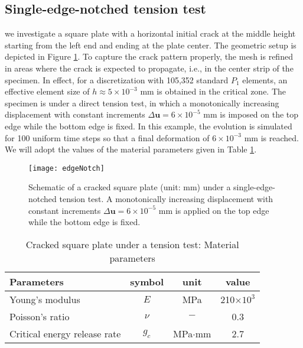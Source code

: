 
\subsection{Single-edge-notched tension test}
 we  investigate a square plate with a horizontal {initial} crack at the middle height starting from the left end and ending at the plate center. The geometric setup is depicted in Figure \ref{Fig:Notched_geometry}. To capture the crack pattern properly, the mesh is refined in areas where the crack is expected to propagate, i.e., in the center strip of the specimen. In effect, for a discretization with 105,352 standard $P_1$ elements, an effective element size of $h\approx 5\times 10^{-3}$ mm is obtained in the critical zone. The specimen is under a direct tension test, in which a monotonically increasing displacement with constant increments $\Delta\bm{u}=6 \times 10^{-5}$ mm is imposed on the top edge while the bottom edge is fixed. In this example, the evolution is simulated for 100 uniform time steps so that a final deformation of $6\times 10^{-3}$ mm is reached. We will adopt the values of the material parameters given in Table \ref{Tab:Notched_input}. 
\begin{figure}[htbp]
    \centering
    \texttt{[image: edgeNotch]}
    \caption{Schematic of a cracked square plate (unit: mm) under a single-edge-notched tension test. 
    A monotonically increasing displacement with constant increments $\Delta\bm{u}=6\times 10^{-5}$ mm is applied on the top edge while the bottom edge is fixed.}
    \label{Fig:Notched_geometry}
\end{figure}

\begin{table}[htbp]
    \centering
    \caption{Cracked square plate under a tension test: Material parameters \cite{ambati2015review}}
    \begin{tabular}{l c c c}
    \hline 
         Parameters & symbol & unit& value \\
    \hline 
         Young's modulus & $E$ &MPa&  210$\times 10^{3}$\\
         Poisson's ratio & $\nu$ &$-$&  0.3\\
         Critical energy release rate & $g_c$ &MPa$\cdot$mm&  2.7\\
            \hline      
    \end{tabular}
    \label{Tab:Notched_input}
\end{table}

